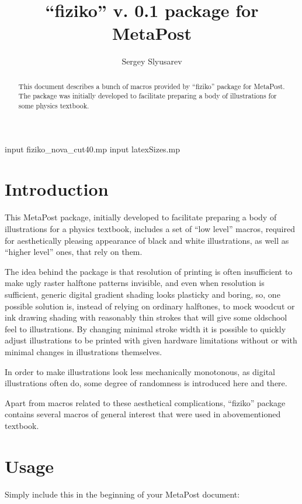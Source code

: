 \documentclass{article}
\author{Sergey Slyusarev}
\title{``fiziko'' v. 0.1 package for MetaPost }
\begin{document}
\begin{empfile}

\begin{empcmds}
input fiziko_nova_cut40.mp
input latexSizes.mp
\end{empcmds}

\maketitle

\begin{abstract}
This document describes a bunch of macros provided by ``fiziko'' package for MetaPost. The package was initially developed to facilitate preparing a body of illustrations for some physics textbook. 
\end{abstract}

\tableofcontents

\section{Introduction}
This MetaPost package, initially developed to facilitate preparing a body of illustrations for a physics textbook, includes a set of ``low level'' macros, required for aesthetically pleasing appearance of black and white illustrations, as well as ``higher level'' ones, that rely on them.

The idea behind the package is that resolution of printing is often insufficient to make ugly raster halftone patterns invisible, and even when resolution is sufficient, generic digital gradient shading looks plasticky and boring, so, one possible solution is, instead of relying on ordinary halftones, to mock woodcut or ink drawing shading with reasonably thin strokes that will give some oldschool feel to illustrations. By changing minimal stroke width it is possible to quickly adjust illustrations to be printed with given hardware limitations without or with minimal changes in illustrations themselves. 

In order to make illustrations look less mechanically monotonous, as digital illustrations often do, some degree of randomness is introduced here and there.

Apart from macros related to these aesthetical complications, ``fiziko'' package contains several macros of general interest that were used in abovementioned textbook.

\section{Usage}
Simply include this in the beginning of your MetaPost document:


\end{empfile}
\end{document}
